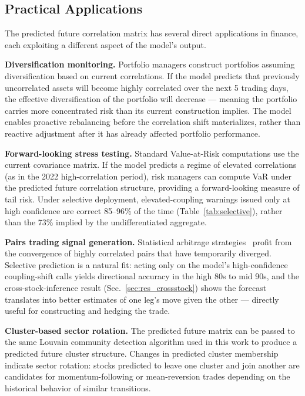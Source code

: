 \documentclass[runningheads]{llncs}
\begin{document}
\subsection{Practical Applications}

The predicted future correlation matrix has several direct applications
in finance, each exploiting a different aspect of the model's output.

\textbf{Diversification monitoring.} Portfolio managers construct
portfolios assuming diversification based on current correlations.
If the model predicts that previously uncorrelated assets will become
highly correlated over the next 5 trading days, the effective
diversification of the portfolio will decrease --- meaning the
portfolio carries more concentrated risk than its current
construction implies. The model enables proactive rebalancing
before the correlation shift materializes, rather than reactive
adjustment after it has already affected portfolio performance.

\textbf{Forward-looking stress testing.} Standard Value-at-Risk
computations use the current covariance matrix. If the model predicts
a regime of elevated correlations (as in the 2022 high-correlation
period), risk managers can compute VaR under the predicted future
correlation structure, providing a forward-looking measure of tail
risk. Under selective deployment, elevated-coupling warnings issued
only at high confidence are correct 85--96\% of the time
(Table~\ref{tab:selective}), rather than the 73\% implied by the
undifferentiated aggregate.

\textbf{Pairs trading signal generation.} Statistical arbitrage
strategies~\cite{avellaneda2010statistical} profit from the convergence
of highly correlated pairs that have temporarily diverged. Selective prediction is a natural fit:
acting only on the model's high-confidence coupling-shift calls yields
directional accuracy in the high 80s to mid 90s, and the
cross-stock-inference result (Sec.~\ref{sec:res_crossstock}) shows the
forecast translates into better estimates of one leg's move given the
other --- directly useful for constructing and hedging the trade.

\textbf{Cluster-based sector rotation.} The predicted future matrix
can be passed to the same Louvain community detection algorithm used
in this work to produce a predicted future cluster structure. Changes
in predicted cluster membership indicate sector rotation: stocks
predicted to leave one cluster and join another are candidates for
momentum-following or mean-reversion trades depending on the
historical behavior of similar transitions.
\end{document}
